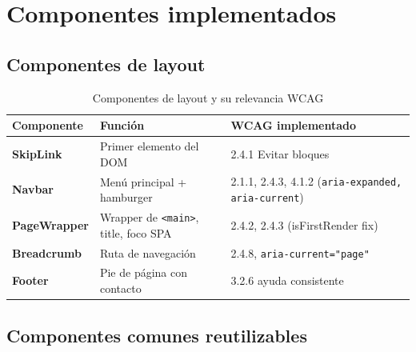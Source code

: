 \documentclass[12pt, a4paper]{article}
\begin{document}
\section{Componentes implementados}

\subsection{Componentes de layout}

\begin{table}[H]
\centering
\caption{Componentes de layout y su relevancia WCAG}
\small
\begin{tabular}{@{}>{\bfseries}p{3cm} p{5cm} p{5.5cm}@{}}
\toprule
\rowcolor{royalblue!12}
\textbf{Componente} & \textbf{Función} & \textbf{WCAG implementado} \\
\midrule
SkipLink & Primer elemento del DOM & 2.4.1 Evitar bloques \\
Navbar & Menú principal + hamburger & 2.1.1, 2.4.3, 4.1.2 (\texttt{aria-expanded, aria-current}) \\
PageWrapper & Wrapper de \texttt{<main>}, title, foco SPA & 2.4.2, 2.4.3 (isFirstRender fix) \\
Breadcrumb & Ruta de navegación & 2.4.8, \texttt{aria-current="page"} \\
Footer & Pie de página con contacto & 3.2.6 ayuda consistente \\
\bottomrule
\end{tabular}
\end{table}

\subsection{Componentes comunes reutilizables}
\end{document}
